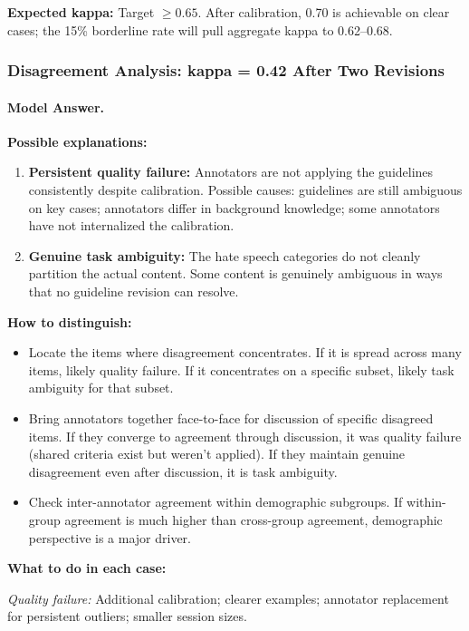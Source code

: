 \textbf{Expected kappa:} Target $\geq 0.65$. After calibration, 0.70 is achievable on clear cases; the 15\% borderline rate will pull aggregate kappa to 0.62--0.68.

\subsubsection{Disagreement Analysis: kappa = 0.42 After Two Revisions}

\paragraph{Model Answer.}

\textbf{Possible explanations:}

\begin{enumerate}
    \item \textbf{Persistent quality failure:} Annotators are not applying the guidelines consistently despite calibration. Possible causes: guidelines are still ambiguous on key cases; annotators differ in background knowledge; some annotators have not internalized the calibration.

    \item \textbf{Genuine task ambiguity:} The hate speech categories do not cleanly partition the actual content. Some content is genuinely ambiguous in ways that no guideline revision can resolve.
\end{enumerate}

\textbf{How to distinguish:}
\begin{itemize}
    \item Locate the items where disagreement concentrates. If it is spread across many items, likely quality failure. If it concentrates on a specific subset, likely task ambiguity for that subset.
    \item Bring annotators together face-to-face for discussion of specific disagreed items. If they converge to agreement through discussion, it was quality failure (shared criteria exist but weren't applied). If they maintain genuine disagreement even after discussion, it is task ambiguity.
    \item Check inter-annotator agreement within demographic subgroups. If within-group agreement is much higher than cross-group agreement, demographic perspective is a major driver.
\end{itemize}

\textbf{What to do in each case:}

\textit{Quality failure:} Additional calibration; clearer examples; annotator replacement for persistent outliers; smaller session sizes.

